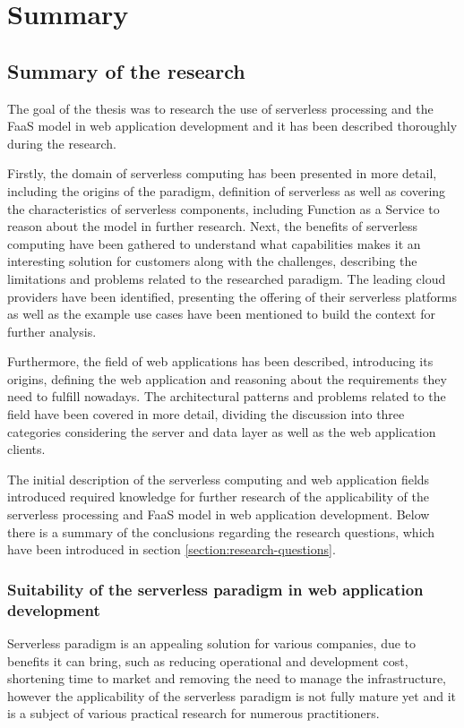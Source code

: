 \chapter{Summary}

\section{Summary of the research}

The goal of the thesis was to research the use of serverless processing and the FaaS model in web application development and it has been described thoroughly during the research.

Firstly, the domain of serverless computing has been presented in more detail, including the origins of the paradigm, definition of serverless as well as covering the characteristics of serverless components, including Function as a Service to reason about the model in further research.
Next, the benefits of serverless computing have been gathered to understand what capabilities makes it an interesting solution for customers along with the challenges, describing the limitations and problems related to the researched paradigm.
The leading cloud providers have been identified, presenting the offering of their serverless platforms as well as the example use cases have been mentioned to build the context for further analysis.

Furthermore, the field of web applications has been described, introducing its origins, defining the web application and reasoning about the requirements they need to fulfill nowadays.
The architectural patterns and problems related to the field have been covered in more detail, dividing the discussion into three categories considering the server and data layer as well as the web application clients.

The initial description of the serverless computing and web application fields introduced required knowledge for further research of the applicability of the serverless processing and FaaS model in web application development.
Below there is a summary of the conclusions regarding the research questions, which have been introduced in section \ref{section:research-questions}.

\subsection{Suitability of the serverless paradigm in web application development}

Serverless paradigm is an appealing solution for various companies, due to benefits it can bring, such as reducing operational and development cost, shortening time to market and removing the need to manage the infrastructure, however the applicability of the serverless paradigm is not fully mature yet and it is a subject of various practical research for numerous practitioners.

